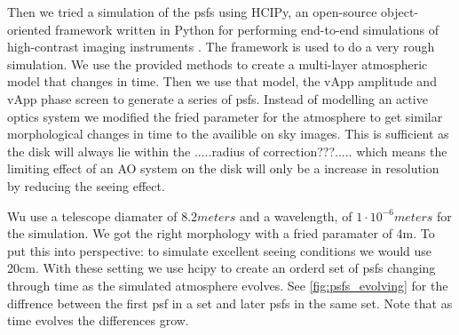 Then we tried a simulation of the psfs using HCIPy, an open-source object-oriented framework written in Python for performing end-to-end simulations of high-contrast imaging instruments \cite{hcipy}. The framework is used to do a very rough simulation. We use the provided methods to create a multi-layer atmospheric model that changes in time. Then we use that model, the vApp amplitude and vApp phase screen to generate a series of psfs. Instead of modelling an active optics system we modified the fried parameter for the atmosphere to get similar morphological changes in time to the availible on sky images. This is sufficient as the disk will always lie within the .....radius of correction???..... which means the limiting effect of an AO system on the disk will only be a increase in resolution by reducing the seeing effect.

Wu use a telescope diamater of $8.2 meters$ and a wavelength, of $1\cdot 10^{-6} meters$ for the simulation. We got the right morphology with a fried paramater of 4m. To put this into perspective: to simulate excellent seeing conditions we would use 20cm. With these setting we use hcipy to create an orderd set of psfs changing through time as the simulated atmosphere evolves. See \autoref{fig:psfs_evolving} for the diffrence between the first psf in a set and later psfs in the same set. Note that as time evolves the differences grow. 

